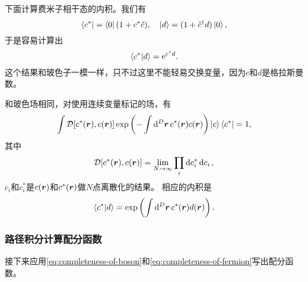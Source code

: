 \documentclass[hyperref, UTF8, a4paper]{ctexart}
\newcommand*{\ee}{\mathrm{e}}
\newcommand*{\fd}[1]{\mathcal{D}{#1}}
\begin{document}
下面计算费米子相干态的内积。我们有
\[
    \bra{c^*} = \bra{0} (1 + c^* \hat{c}), \quad \ket{d} = (1 + \hat{c}^\dagger d) \ket{0},
\]
于是容易计算出
\[
    \braket{c^*}{d} = \ee^{c^* d}.
\]
这个结果和玻色子一模一样，只不过这里不能轻易交换变量，因为$c$和$d$是格拉斯曼数。

和玻色场相同，对使用连续变量标记的场，有
\begin{equation}
    \int \fd{[c^*(\vb*{r}), c(\vb*{r})]} \exp \left( - \int \dd[D]{\vb*{r}} c^*(\vb*{r}) c(\vb*{r}) \right) \ket{c} \bra{c^*} = 1,
    \label{eq:completeness-of-fermion}
\end{equation}
其中
\begin{equation}
    \fd{[c^*(\vb*{r}), c(\vb*{r})]} = \lim_{N\to \infty} \prod_i \dd{c^*_i} \dd{c_i},
\end{equation}
$c_i$和$c_i^*$是$c(\vb*{r})$和$c^*(\vb*{r})$做$N$点离散化的结果。
相应的内积是
\begin{equation}
    \braket{c^*}{d} = \exp \left( \int \dd[D]{\vb*{r}} c^*(\vb*{r}) d(\vb*{r}) \right).
\end{equation}

\subsubsection{路径积分计算配分函数}

接下来应用\eqref{eq:completeness-of-boson}和\eqref{eq:completeness-of-fermion}写出配分函数。
\end{document}

